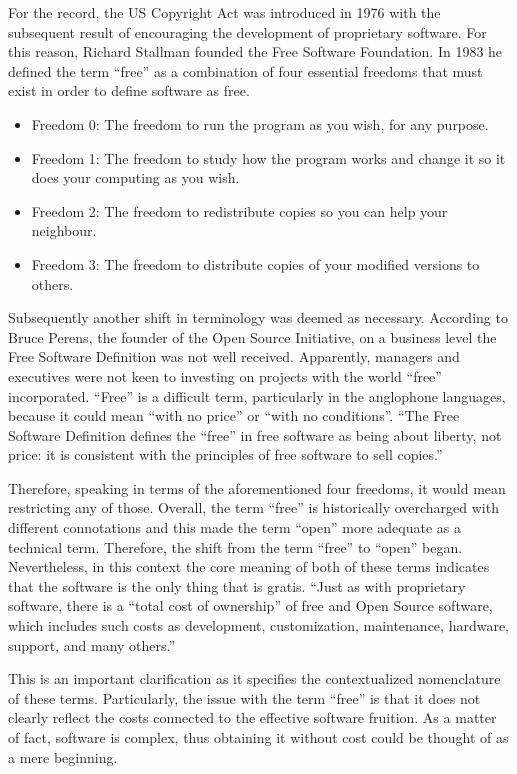 For the record, the US Copyright Act was introduced in 1976 with the subsequent result of encouraging the development of proprietary software.
For this reason, Richard Stallman founded the Free Software Foundation. In 1983 he defined the term “free” as a combination of four essential freedoms that must exist in order to define software as free.

\begin{itemize}
\item Freedom 0: The freedom to run the program as you wish, for any purpose.
\item Freedom 1: The freedom to study how the program works and change it so it does your computing as you wish.
\item Freedom 2: The freedom to redistribute copies so you can help your neighbour.
\item Freedom 3: The freedom to distribute copies of your modified versions to others.
\end{itemize}

Subsequently another shift in terminology was deemed as necessary. According to Bruce Perens, the founder of the Open Source Initiative, on a business level the Free Software Definition was not well received. Apparently, managers and executives were not keen to investing on projects with the world “free” incorporated.
“Free” is a difficult term, particularly in the anglophone languages, because it could mean “with no price” or “with no conditions”.
“The Free Software Definition defines the “free” in free software as being about liberty, not price: it is consistent with the principles of free software to sell copies.”

Therefore, speaking in terms of the aforementioned four freedoms, it would mean restricting any of those. Overall, the term “free” is historically overcharged with different connotations and this made the term “open” more adequate as a technical term. Therefore, the shift from the term “free” to “open” began. Nevertheless, in this context the core meaning of both of these terms indicates that the software is the only thing that is gratis. “Just as with proprietary software, there is a “total cost of ownership” of free and Open Source software, which includes such costs as development, customization, maintenance, hardware, support, and many others.”

This is an important clarification as it specifies the contextualized nomenclature of these terms. Particularly, the issue with the term “free” is that it does not clearly reflect the costs connected to the effective software fruition. As a matter of fact, software is complex, thus obtaining it without cost could be thought of as a mere beginning.

